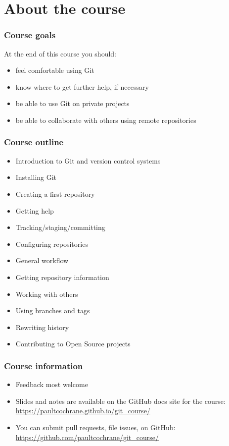 \section{About the course}

\begin{frame}
\frametitle{Course goals}

At the end of this course you should:

\begin{itemize}
    \item feel comfortable using Git
    \item know where to get further help, if necessary
    \item be able to use Git on private projects
    \item be able to collaborate with others using remote repositories
\end{itemize}
\end{frame}

\begin{frame}
\frametitle{Course outline}
\begin{itemize}
    \item Introduction to Git and version control systems
    \item Installing Git
    \item Creating a first repository
    \item Getting help
    \item Tracking/staging/committing
    \item Configuring repositories
    \item General workflow
    \item Getting repository information
    \item Working with others
    \item Using branches and tags
    \item Rewriting history
    \item Contributing to Open Source projects
\end{itemize}
\end{frame}


\begin{frame}
\frametitle{Course information}
\begin{itemize}
    \item Feedback most welcome
    \item Slides and notes are available on the GitHub docs site for the
        course:\\
        {\footnotesize \url{https://paultcochrane.github.io/git\_course/}}
    \item You can submit pull requests, file issues, on GitHub:\\
        {\footnotesize \url{https://github.com/paultcochrane/git\_course/}}
\end{itemize}
\end{frame}

